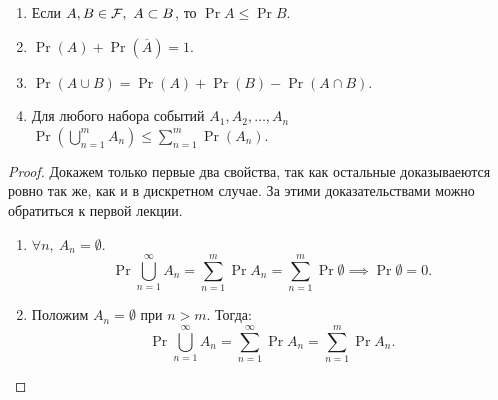 \begin{itemize}
\begin{lemma}
\begin{enumerate}
            \item Если \(A, B \in \mathcal{F}, \ A \subset B \), то \(\Pr{A} \leq \Pr{B} \).
            
            \item \(\Pr(A) + \Pr(\overline{A}) = 1\).
            
            \item \(\Pr(A \cup B) = \Pr(A) + \Pr(B) - \Pr(A \cap B)\).
            \item Для любого набора событий \(A_1, A_2, \ldots, A_n\) \(\Pr\left(\bigcup\limits_{n = 1}^{m} A_n\right) \leq \sum\limits_{n = 1}^{m} \Pr(A_n)\).
        \end{enumerate}               
   \end{lemma} 
 
    \begin{proof} 
        Докажем только первые два свойства, так как остальные доказываеются ровно так же, как и в дискретном случае. За этими доказательствами можно обратиться к первой лекции.
        
        \begin{enumerate}
            \item \( \forall n,\ A_n = \emptyset\).
            \[
                \Pr{\bigcup\limits_{n = 1}^{\infty}A_n} = \sum\limits_{n = 1}^{m}\Pr{A_n} = \sum\limits_{n = 1}^{m}\Pr{\emptyset} \implies \Pr{\emptyset} = 0.
            \]
            
            \item Положим \(A_n = \emptyset \) при \(n > m \). Тогда:
            \[
                \Pr{\bigcup\limits_{n = 1}^{\infty}A_n} = \sum\limits_{n = 1}^{\infty}\Pr{A_n} = \sum\limits_{n = 1}^{m}\Pr{A_n}.
            \]
        \end{enumerate}
    \end{proof}
    
\end{itemize}

